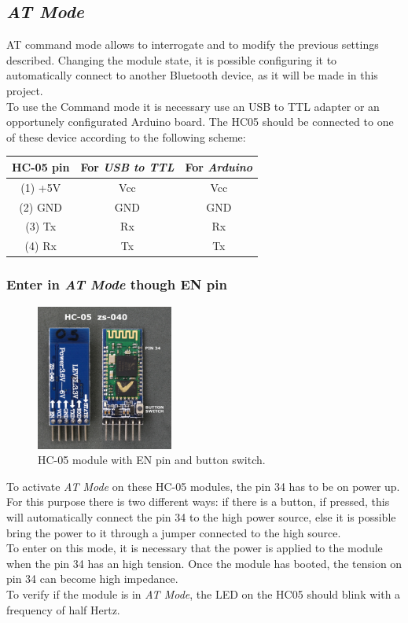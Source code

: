 \subsection{\textit{AT Mode}}
AT command mode allows to interrogate and to modify the previous settings described. Changing the module state, it is possible configuring it to automatically connect to another Bluetooth device, as it will be made in this project.\\
To use the Command mode it is necessary use an USB to TTL adapter or an opportunely configurated Arduino board. The HC05 should be connected to one of these device according to the following scheme:\\

\begin{tabular}{|c|c|c|}
	\hline 
	\textbf{HC-05 pin} & \textbf{For \textit{USB to TTL}} & \textbf{For \textit{Arduino}} \\ 
	\hline 
	(1) +5V & Vcc & Vcc \\ 
	\hline 
	(2) GND & GND & GND \\ 
	\hline 
	(3) Tx & Rx & Rx \\ 
	\hline 
	(4) Rx & Tx & Tx \\ 
	\hline 
\end{tabular}

\subsubsection{Enter in \textit{AT Mode} though EN pin}
\begin{figure}[H]
	\hspace*{0.3 \textwidth}\includegraphics[width= 0.4\textwidth]
	{files/images/hc05_en_pin}
	\caption{HC-05 module with EN pin and button switch.}
\end{figure}
To activate \textit{AT Mode} on these HC-05 modules, the pin 34 has to be on power up. For this purpose there is two different ways: if there is a button, if pressed, this will automatically connect the pin 34 to the high power source, else it is possible bring the power to it through a jumper connected to the high source.\\
To enter on this mode, it is necessary that the power is applied to the module when the pin 34 has an high tension. Once the module has booted, the tension on pin 34 can become high impedance.\\
To verify if the module is in \textit{AT Mode}, the LED on the HC05 should blink with a frequency of half Hertz.

